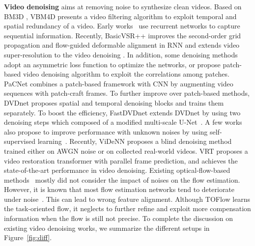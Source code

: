 \documentclass[10pt,twocolumn,letterpaper]{article}
\newlength \g
\begin{document}
\vspace{0.5mm}
\noindent\textbf{Video denoising}
aims at removing noise to synthesize clean videos.
Based on BM3D \cite{dabov2007bm3d}, VBM4D \cite{maggioni2012bm4d} presents a video filtering algorithm to exploit temporal and spatial redundancy of a video.
Early works~\cite{chen2016drnn} use recurrent networks to capture sequential information.
Recently, BasicVSR++ \cite{chan2021basicvsrpp} improves the second-order grid propagation and flow-guided deformable alignment in RNN and extends video super-resolution to the video denoising \cite{chan2022basicvsrpp2}.
In addition, some denoising methods adopt an asymmetric loss function \cite{vogels2018kpnn} to optimize the networks, or propose patch-based video denoising algorithm \cite{arias2018vnlb,davy2018vnlnet} to exploit the correlations among patches.
PaCNet \cite{vaksman2021patch} combines a patch-based framework with CNN by augmenting video sequences with patch-craft frames.
To further improve over patch-based methods, DVDnet \cite{tassano2019dvdnet} proposes spatial and temporal denoising blocks and trains them separately.
To boost the efficiency, FastDVDnet \cite{tassano2020fastdvdnet} extends DVDnet \cite{tassano2019dvdnet} by using two denoising steps which composed of a modified multi-scale U-Net~\cite{ronneberger2015u}. 
A few works also propose to improve performance with unknown noises by using self-supervised learning~\cite{sheth2021unsupervised, dewil2021self, dewil2022self}.
Recently, ViDeNN \cite{claus2019videnn} proposes a blind denoising method trained either on AWGN noise or on collected real-world videos. VRT \cite{liang2022vrt} proposes a video restoration transformer with parallel frame prediction, and achieves the state-of-the-art performance in video denoising. 
Existing optical-flow-based methods~\cite{wang2019edvr,liang2022vrt,li2022flornn,chan2021basicvsrpp, yu2020joint} mostly did not consider the impact of noises on the flow estimation. However, it is known that most flow estimation networks tend to deteriorate under noise~\cite{xue2019toflow}. 
This can lead to wrong feature alignment. 
Although TOFlow \cite{xue2019toflow} learns the task-oriented flow, it neglects to further refine and exploit more compensation information when the flow is still not precise.
To complete the discussion on existing video denoising works, we summarize the different setups in Figure~\ref{fig:diff}.






\newpage
\end{document}
